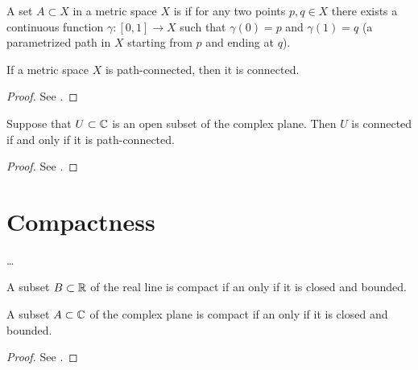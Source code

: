 \begin{definition}
  \label{def:path_connected}
  A set $A \subset X$ in a metric space $X$
  is  if for any two points $p, q \in X$
  there exists a continuous function $\gamma \colon [0,1] \to X$
  such that $\gamma(0) = p$ and $\gamma(1) = q$
  (a parametrized path in $X$ starting from $p$ and ending at $q$).
\end{definition}

\begin{lemma}
  \label{lem:path_connected_implies_connected}
  If a metric space $X$ is path-connected, then it is connected.
\end{lemma}
\begin{proof}
  See \MetSpCourse{}.
\end{proof}

\begin{lemma}
  \label{lem:open_connected_iff_path_connected}
  Suppose that $U \subset \mathbb{C}$ is an open subset of the complex plane.
  Then $U$ is connected if and only if it is path-connected.
\end{lemma}
\begin{proof}
  See \MetSpCourse{}.
\end{proof}

\section{Compactness}

\begin{definition}[Compactness]
  \label{def:compact}
  \ldots
\end{definition}

\begin{theorem}
  \label{thm:bolzano_weierstrass}
  A subset $B \subset \mathbb{R}$ of the real line is compact
  if an only if it is closed and bounded.

  A subset $A \subset \mathbb{C}$ of the complex plane is compact
  if an only if it is closed and bounded.
\end{theorem}
\begin{proof}
  See \MetSpCourse{}.
\end{proof}

